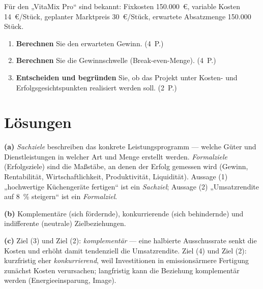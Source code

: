 \documentclass[11pt, a4paper]{article}
\begin{document}
Für den „VitaMix Pro`` sind bekannt: Fixkosten 150.000~€, variable Kosten 14~€/Stück,
geplanter Marktpreis 30~€/Stück, erwartete Absatzmenge 150.000 Stück.

\begin{enumerate}[label=(\alph*)]
  \item \textbf{Berechnen} Sie den erwarteten Gewinn. \hfill (4~P.)
  \item \textbf{Berechnen} Sie die Gewinnschwelle (Break-even-Menge). \hfill (4~P.)
  \item \textbf{Entscheiden und begründen} Sie, ob das Projekt unter Kosten- und Erfolgsgesichtspunkten realisiert werden soll. \hfill (2~P.)
\end{enumerate}

\newpage
\section{Lösungen}\label{loesungen}

\begin{loesung}[title={Lösung Aufgabe~1 --- Zielsystem des Unternehmens}]
\textbf{(a)} \emph{Sachziele} beschreiben das konkrete Leistungsprogramm --- welche Güter
und Dienstleistungen in welcher Art und Menge erstellt werden. \emph{Formalziele}
(Erfolgsziele) sind die Maßstäbe, an denen der Erfolg gemessen wird (Gewinn,
Rentabilität, Wirtschaftlichkeit, Produktivität, Liquidität). Aussage (1) „hochwertige
Küchengeräte fertigen`` ist ein \emph{Sachziel}; Aussage (2) „Umsatzrendite auf 8~\%
steigern`` ist ein \emph{Formalziel}.

\textbf{(b)} Komplementäre (sich fördernde), konkurrierende (sich behindernde) und
indifferente (neutrale) Zielbeziehungen.

\textbf{(c)} Ziel (3) und Ziel (2): \emph{komplementär} --- eine halbierte Ausschussrate
senkt die Kosten und erhöht damit tendenziell die Umsatzrendite. Ziel (4) und Ziel (2):
kurzfristig eher \emph{konkurrierend}, weil Investitionen in emissionsärmere Fertigung
zunächst Kosten verursachen; langfristig kann die Beziehung komplementär werden
(Energieeinsparung, Image).
\end{loesung}
\end{document}
